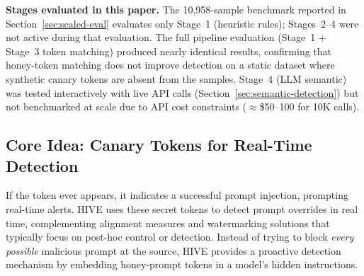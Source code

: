 \documentclass[manuscript,screen,review]{acmart}
\begin{document}
\textbf{Stages evaluated in this paper.} The 10{,}958-sample benchmark reported in Section~\ref{sec:scaled-eval} evaluates only Stage~1 (heuristic rules); Stages~2--4 were not active during that evaluation. The full pipeline evaluation (Stage~1 + Stage~3 token matching) produced nearly identical results, confirming that honey-token matching does not improve detection on a static dataset where synthetic canary tokens are absent from the samples. Stage~4 (LLM semantic) was tested interactively with live API calls (Section~\ref{sec:semantic-detection}) but not benchmarked at scale due to API cost constraints ($\approx$\$50--100 for 10K calls).

\subsection{Core Idea: Canary Tokens for Real-Time Detection} 
If the token ever appears, it indicates a successful prompt injection, prompting real-time alerts.
HIVE uses these secret tokens to detect prompt overrides in real time, complementing alignment measures and watermarking solutions that typically focus on post-hoc control or detection. Instead of trying to block \textit{every possible} malicious prompt at the source, HIVE provides a proactive detection mechanism by embedding honey-prompt tokens in a model's hidden instructions.
\end{document}
